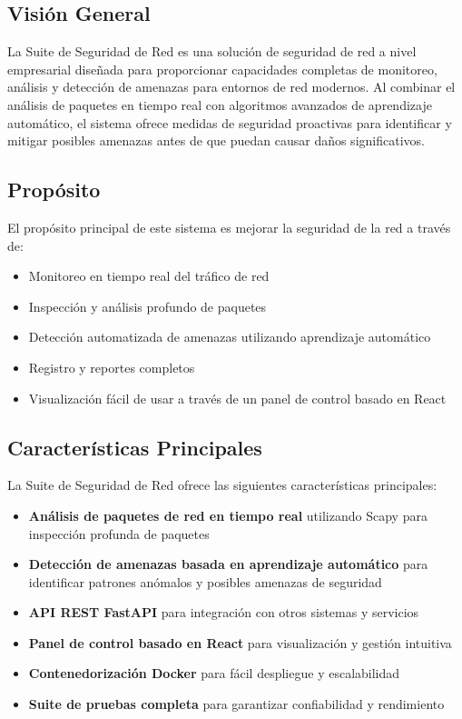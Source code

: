 \subsection{Visión General}
La Suite de Seguridad de Red es una solución de seguridad de red a nivel empresarial diseñada para proporcionar capacidades completas de monitoreo, análisis y detección de amenazas para entornos de red modernos. Al combinar el análisis de paquetes en tiempo real con algoritmos avanzados de aprendizaje automático, el sistema ofrece medidas de seguridad proactivas para identificar y mitigar posibles amenazas antes de que puedan causar daños significativos.

\subsection{Propósito}
El propósito principal de este sistema es mejorar la seguridad de la red a través de:
\begin{itemize}
    \item Monitoreo en tiempo real del tráfico de red
    \item Inspección y análisis profundo de paquetes
    \item Detección automatizada de amenazas utilizando aprendizaje automático
    \item Registro y reportes completos
    \item Visualización fácil de usar a través de un panel de control basado en React
\end{itemize}

\subsection{Características Principales}
La Suite de Seguridad de Red ofrece las siguientes características principales:
\begin{itemize}
    \item \textbf{Análisis de paquetes de red en tiempo real} utilizando Scapy para inspección profunda de paquetes
    \item \textbf{Detección de amenazas basada en aprendizaje automático} para identificar patrones anómalos y posibles amenazas de seguridad
    \item \textbf{API REST FastAPI} para integración con otros sistemas y servicios
    \item \textbf{Panel de control basado en React} para visualización y gestión intuitiva
    \item \textbf{Contenedorización Docker} para fácil despliegue y escalabilidad
    \item \textbf{Suite de pruebas completa} para garantizar confiabilidad y rendimiento
\end{itemize}

